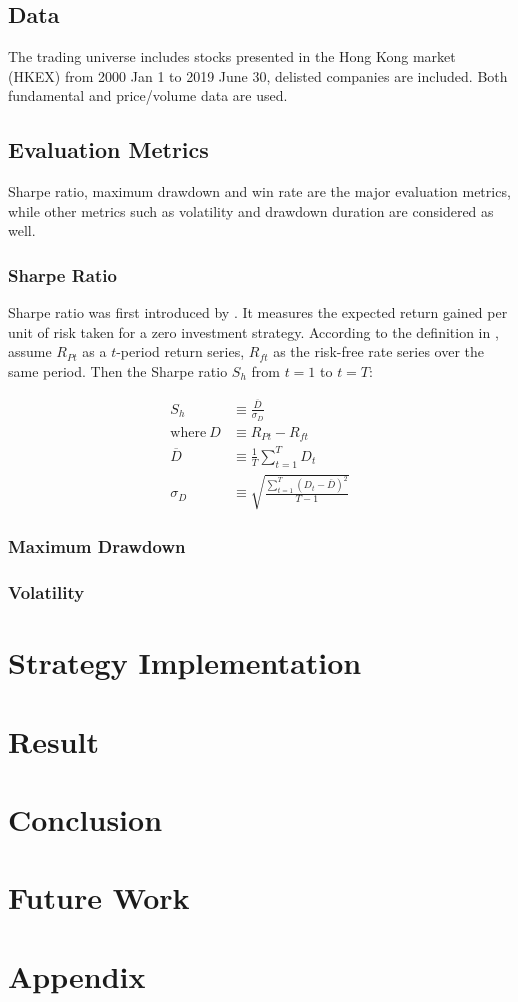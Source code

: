 \documentclass[12pt]{article}
\begin{document}
\subsection{Data}

The trading universe includes stocks presented in the Hong Kong market (HKEX) from 2000 Jan 1 to 2019 June 30, delisted companies are included. Both fundamental and price/volume data are used.

\subsection{Evaluation Metrics}

Sharpe ratio, maximum drawdown and win rate are the major evaluation metrics, while other metrics such as volatility and drawdown duration are considered as well.

\subsubsection{Sharpe Ratio}

Sharpe ratio was first introduced by \cite{sharpe1966}. It measures the expected return gained per unit of risk taken for a zero investment strategy. According to the definition in \cite{sharpe1994}, assume \(R_{Pt}\) as a \(t\)-period return series, \(R_{ft}\) as the risk-free rate series over the same period. Then the Sharpe ratio \(S_h\) from \(t=1\) to \(t=T\):

\begin{align*}
  S_h &\equiv \frac{\overline{D}}{\sigma_D} \\
  \text{where}~D &\equiv R_{Pt} - R_{ft} \\
  \overline{D} &\equiv \frac{1}{T} \sum_{t=1}^T D_t \\
  \sigma_D &\equiv \sqrt{\frac{\sum_{t=1}^T (D_t-\overline{D})^2}{T-1}}
\end{align*}

\subsubsection{Maximum Drawdown}

\subsubsection{Volatility}

\section{Strategy Implementation}

\section{Result}

\section{Conclusion}

\section{Future Work}

\section{Appendix}

\renewcommand{\refname}{Reference} %
\printbibliography
\end{document}
